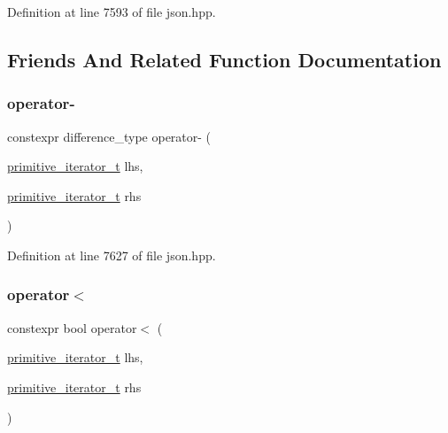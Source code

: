Definition at line 7593 of file json.\+hpp.



\subsection{Friends And Related Function Documentation}
\mbox{\label{classnlohmann_1_1detail_1_1primitive__iterator__t_ac6d902d6ec9a02dabed5452d3ae78f7e}} 
\subsubsection{\texorpdfstring{operator-\/}{operator-}}
{\footnotesize\ttfamily constexpr difference\+\_\+type operator-\/ (\begin{DoxyParamCaption}\item[{\mbox{\hyperlink{classnlohmann_1_1detail_1_1primitive__iterator__t}{primitive\+\_\+iterator\+\_\+t}}}]{lhs,  }\item[{\mbox{\hyperlink{classnlohmann_1_1detail_1_1primitive__iterator__t}{primitive\+\_\+iterator\+\_\+t}}}]{rhs }\end{DoxyParamCaption})\hspace{0.3cm}{\ttfamily [friend]}}



Definition at line 7627 of file json.\+hpp.

\mbox{\label{classnlohmann_1_1detail_1_1primitive__iterator__t_a901a95e6d73c9509d3dcde914f6c8a9d}} 
\subsubsection{\texorpdfstring{operator$<$}{operator<}}
{\footnotesize\ttfamily constexpr bool operator$<$ (\begin{DoxyParamCaption}\item[{\mbox{\hyperlink{classnlohmann_1_1detail_1_1primitive__iterator__t}{primitive\+\_\+iterator\+\_\+t}}}]{lhs,  }\item[{\mbox{\hyperlink{classnlohmann_1_1detail_1_1primitive__iterator__t}{primitive\+\_\+iterator\+\_\+t}}}]{rhs }\end{DoxyParamCaption})\hspace{0.3cm}{\ttfamily [friend]}}



